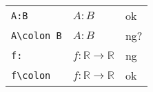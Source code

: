 \documentclass[preview]{standalone}
\newcommand{\tA}[1]{\textcolor{cA}{#1}}
\newcommand{\tC}[1]{\textcolor{cC}{#1}}
\newcommand{\tD}[1]{\textcolor{cD}{#1}}
\begin{document}
\begin{table}[h]
    \centering
    \begin{tabular}{lll}
        \verb|A:B|       & $A:B$                               & \tA{ok} \\
        \verb|A\colon B| & $A\colon B$                         & \tC{ng?} \\
        \verb|f:|        & $f:\mathbb{R} \to \mathbb{R}$       & \tD{ng} \\
        \verb|f\colon|   & $f\colon \mathbb{R} \to \mathbb{R}$ & \tA{ok}
    \end{tabular}
\end{table}
\end{document}
